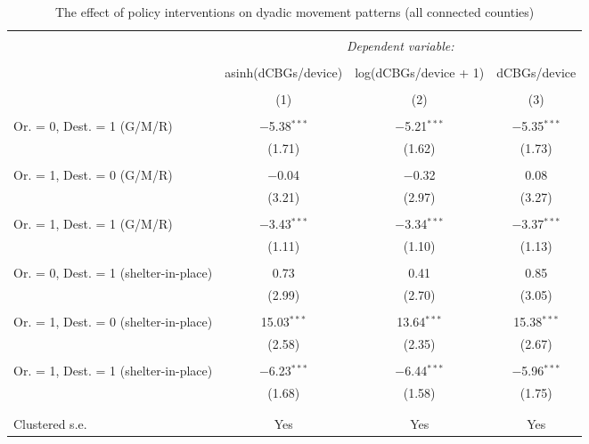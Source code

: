 
\begin{table}[!htbp] \centering 
  \caption{The effect of policy interventions on dyadic movement patterns (all connected counties)} 
  \label{tab:dyad_model_all} 
\footnotesize 
\begin{tabular}{@{\extracolsep{5pt}}lccc} 
\\[-1.8ex]\hline 
\hline \\[-1.8ex] 
 & \multicolumn{3}{c}{\textit{Dependent variable:}} \\ 
\cline{2-4} 
\\[-1.8ex] & asinh(dCBGs/device) & log(dCBGs/device + 1) & dCBGs/device \\ 
\\[-1.8ex] & (1) & (2) & (3)\\ 
\hline \\[-1.8ex] 
 Or. = 0, Dest. = 1 (G/M/R) & $-$5.38$^{***}$ & $-$5.21$^{***}$ & $-$5.35$^{***}$ \\ 
  & (1.71) & (1.62) & (1.73) \\ 
  & & & \\ 
 Or. = 1, Dest. = 0 (G/M/R) & $-$0.04 & $-$0.32 & 0.08 \\ 
  & (3.21) & (2.97) & (3.27) \\ 
  & & & \\ 
 Or. = 1, Dest. = 1 (G/M/R) & $-$3.43$^{***}$ & $-$3.34$^{***}$ & $-$3.37$^{***}$ \\ 
  & (1.11) & (1.10) & (1.13) \\ 
  & & & \\ 
 Or. = 0, Dest. = 1 (shelter-in-place) & 0.73 & 0.41 & 0.85 \\ 
  & (2.99) & (2.70) & (3.05) \\ 
  & & & \\ 
 Or. = 1, Dest. = 0 (shelter-in-place) & 15.03$^{***}$ & 13.64$^{***}$ & 15.38$^{***}$ \\ 
  & (2.58) & (2.35) & (2.67) \\ 
  & & & \\ 
 Or. = 1, Dest. = 1 (shelter-in-place) & $-$6.23$^{***}$ & $-$6.44$^{***}$ & $-$5.96$^{***}$ \\ 
  & (1.68) & (1.58) & (1.75) \\ 
  & & & \\ 
\hline \\[-1.8ex] 
Clustered s.e. & Yes & Yes & Yes \\ 

\end{tabular}
\end{table}
